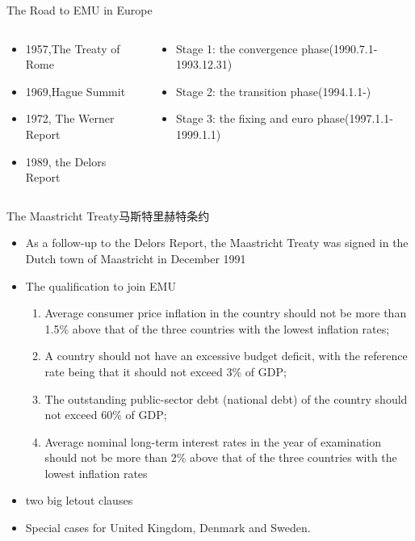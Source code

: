 \documentclass[10pt,hyperref={CJKbookmarks=true},xcolor=dvipsnames,aspectratio=169]{beamer}
\begin{document}
\begin{frame}{The Road to EMU in Europe}
	\begin{columns}
		\begin{column}{0.5\textwidth}
			\begin{itemize}
				\item 1957,The Treaty of Rome
				\item 1969,Hague Summit
				\item 1972, The Werner Report
				\item 1989, the Delors Report
			\end{itemize}
		\end{column}
			\begin{column}{0.5\textwidth}
		\begin{itemize}
			\item Stage 1: the convergence phase(1990.7.1-1993.12.31)
			\item Stage 2: the transition phase(1994.1.1-)
			\item Stage 3: the fixing and euro phase(1997.1.1-1999.1.1)

		\end{itemize}
	\end{column}
	\end{columns}
\end{frame}
\begin{frame}{The Maastricht Treaty马斯特里赫特条约}

	\begin{itemize}
		\item As a follow-up to the Delors Report, the Maastricht Treaty was signed in the Dutch
		town of Maastricht in December 1991
		\item The qualification to join EMU
		\begin{enumerate}
			\item Average consumer price inflation in the country should not be more than 1.5\% 
			above that of the three countries with the lowest inflation rates;
			\item A country should not have an excessive budget deficit, with the reference rate
			being that it should not exceed 3\% of GDP;
			\item The outstanding public-sector debt (national debt) of the country should not
			exceed 60\% of GDP;
			\item  Average nominal long-term interest rates in the year of examination should not be
			more than 2\% above that of the three countries with the lowest inflation rates
		\end{enumerate}
	\item two big letout clauses
	\item Special cases for  United Kingdom, Denmark and Sweden.
	\end{itemize}

\end{frame}
\end{document}
